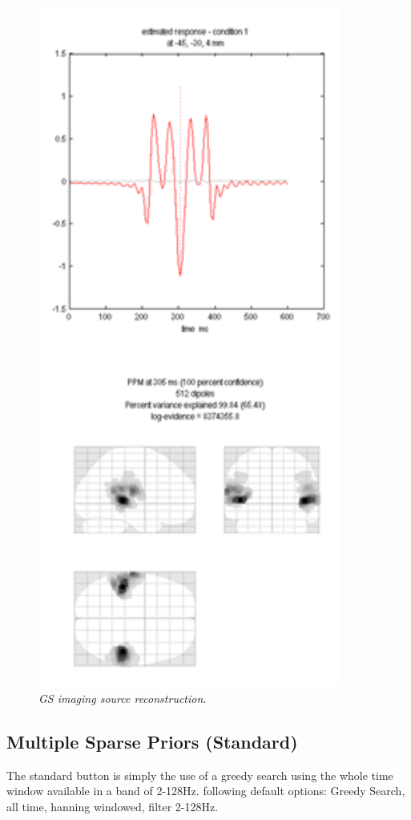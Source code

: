 \begin{figure}
\begin{center}
\includegraphics[width=100mm]{meg_sloc/slide8}
\caption{\em GS imaging source reconstruction.\label{meg_sloc:fig:8}}
\end{center}
\end{figure}

\subsection{Multiple Sparse Priors (Standard)}
The standard button is simply the use of a greedy search using the whole time window available in a band of 2-128Hz. following default options: Greedy Search, all time, hanning windowed, filter 2-128Hz.

